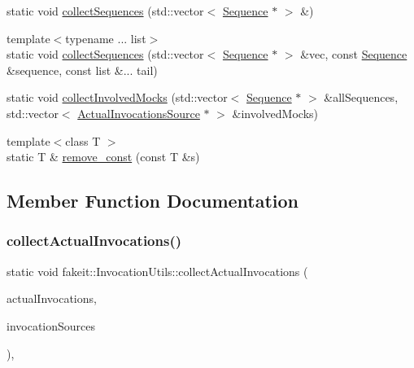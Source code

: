 \begin{DoxyCompactItemize}
\item 
static void \mbox{\hyperlink{structfakeit_1_1InvocationUtils_ac2d11afbe797cdd0978cf42a25c4c1a6}{collect\+Sequences}} (std\+::vector$<$ \mbox{\hyperlink{classfakeit_1_1Sequence}{Sequence}} $\ast$ $>$ \&)
\item 
{\footnotesize template$<$typename ... list$>$ }\\static void \mbox{\hyperlink{structfakeit_1_1InvocationUtils_a43b674a2f1109acf4c870e8fb9c2571d}{collect\+Sequences}} (std\+::vector$<$ \mbox{\hyperlink{classfakeit_1_1Sequence}{Sequence}} $\ast$ $>$ \&vec, const \mbox{\hyperlink{classfakeit_1_1Sequence}{Sequence}} \&sequence, const list \&... tail)
\item 
static void \mbox{\hyperlink{structfakeit_1_1InvocationUtils_a8a2610f9bc4c88cb2705221970bb93d6}{collect\+Involved\+Mocks}} (std\+::vector$<$ \mbox{\hyperlink{classfakeit_1_1Sequence}{Sequence}} $\ast$ $>$ \&all\+Sequences, std\+::vector$<$ \mbox{\hyperlink{structfakeit_1_1ActualInvocationsSource}{Actual\+Invocations\+Source}} $\ast$ $>$ \&involved\+Mocks)
\item 
{\footnotesize template$<$class T $>$ }\\static T \& \mbox{\hyperlink{structfakeit_1_1InvocationUtils_ad92724e2654997a1db229644d7f2ada9}{remove\+\_\+const}} (const T \&s)
\end{DoxyCompactItemize}


\subsection{Member Function Documentation}
\mbox{\label{structfakeit_1_1InvocationUtils_a0bb553d912e1d41f5fc1cf2d16ae9e55}} 
\subsubsection{\texorpdfstring{collectActualInvocations()}{collectActualInvocations()}\hspace{0.1cm}{\footnotesize\ttfamily [1/9]}}
{\footnotesize\ttfamily static void fakeit\+::\+Invocation\+Utils\+::collect\+Actual\+Invocations (\begin{DoxyParamCaption}\item[{std\+::unordered\+\_\+set$<$ \mbox{\hyperlink{structfakeit_1_1Invocation}{Invocation}} $\ast$ $>$ \&}]{actual\+Invocations,  }\item[{std\+::vector$<$ \mbox{\hyperlink{structfakeit_1_1ActualInvocationsSource}{Actual\+Invocations\+Source}} $\ast$ $>$ \&}]{invocation\+Sources }\end{DoxyParamCaption})\hspace{0.3cm}{\ttfamily [inline]}, {\ttfamily [static]}}

